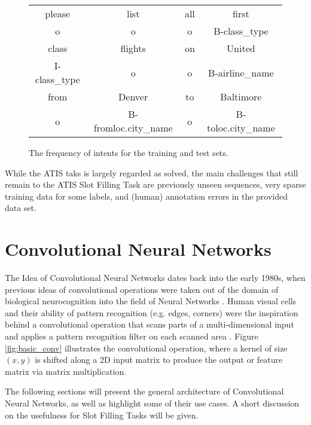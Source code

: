 \documentclass[11pt,a4paper,twoside,openright]{scrbook}
\begin{document}
\begin{itemize}
\begin{figure}[h]
  \begin{center}
    \begin{tabular}{| c c c c |}\hline
      please & list & all & first \\
      o & o & o & B-class\_type  \\ \hline
      class & flights & on & United \\
      I-class\_type & o & o & B-airline\_name \\ \hline
      from & Denver & to & Baltimore \\
      o & B-fromloc.city\_name & o & B-toloc.city\_name \\
      \hline
    \end{tabular}
  \end{center}
  \caption{The frequency of intents for the training and test sets. \cite[p.\,20]{Tur10}}
  \label{fig:ATISexample}
\end{figure}
\end{itemize}

While the ATIS taks is largely regarded as solved, the main challenges that still remain to the ATIS Slot Filling Task are previously unseen sequences, very sparse training data for some labels, and (human) annotation errors in the provided data set. \cite{Tur10}

\chapter{Convolutional Neural Networks}
The Idea of Convolutional Neural Networks dates back into the early 1980s, when previous ideas of convolutional operations were taken out of the domain of biological neurocognition into the field of Neural Networks \cite{Fukushima82}. Human visual cells and their ability of pattern recognition (e.g. edges, corners) were the inspiration behind a convolutional operation that scans parts of a multi-dimensional input and applies a pattern recognition filter on each scanned area \cite{url:worldlibrary:cnn}. Figure \ref{fig:basic_conv} illustrates the convolutional operation, where a kernel of size \((x,y)\) is shifted along a 2D input matrix to produce the output or feature matrix via matrix multiplication.

The following sections will present the general architecture of Convolutional Neural Networks, as well as highlight some of their use cases. A short discussion on the usefulness for Slot Filling Tasks will be given.
\end{document}
